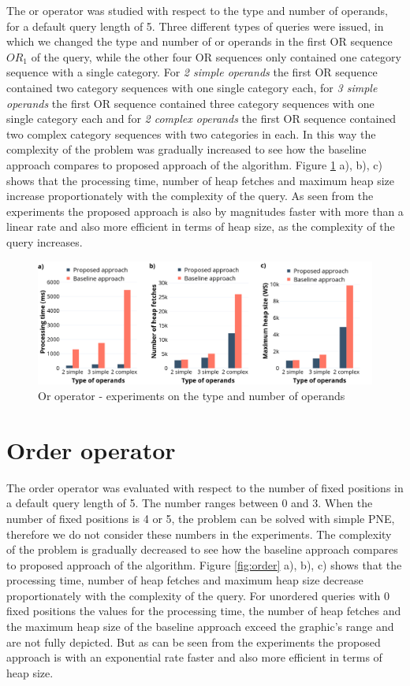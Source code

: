 The or operator was studied with respect to the type and number of operands, for a default query length of 5. Three different types of queries were issued, in which we changed the type and number of or operands in the first OR sequence $OR_1$ of the query, while the other four OR sequences only contained one category sequence with a single category. For \textit{2 simple operands} the first OR sequence contained two category sequences with one single category each, for \textit{3 simple operands} the first OR sequence contained three category sequences with one single category each and for \textit{2 complex operands} the first OR sequence contained two complex category sequences with two categories in each. In this way the complexity of the problem was gradually increased to see how the baseline approach compares to proposed approach of the algorithm.  
Figure \ref{fig:or} a), b), c) shows that the processing time, number of heap fetches and maximum heap size increase proportionately with the complexity of the query. As seen from the experiments the proposed approach is also by magnitudes faster with more than a linear rate and also more efficient in terms of heap size, as the complexity of the query increases. 

\begin{figure}[H]
	\includegraphics[scale=0.29]{images/or.png}
	\centering
	\caption{Or operator - experiments on the type and number of operands}
	\label{fig:or}
\end{figure}


\section{Order operator}
\label{sec:experimentsOrder}

The order operator was evaluated with respect to the number of fixed positions in a default query length of 5. The number ranges between 0 and 3. When the number of fixed positions is 4 or 5, the problem can be solved with simple PNE, therefore we do not consider these numbers in the experiments. The complexity of the problem is gradually decreased to see how the baseline approach compares to proposed approach of the algorithm.  
Figure \ref{fig:order} a), b), c) shows that the processing time, number of heap fetches and maximum heap size decrease proportionately with the complexity of the query. For unordered queries with 0 fixed positions the values for the processing time, the number of heap fetches and the maximum heap size of the baseline approach exceed the graphic's range and are not fully depicted. But as can be seen from the experiments the proposed approach is with an exponential rate faster and also more efficient in terms of heap size. \newline

